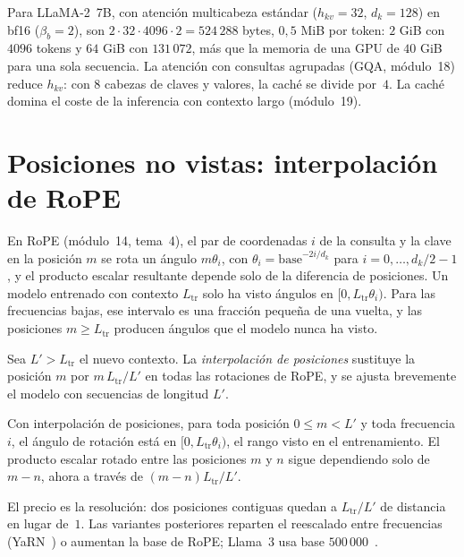 Para LLaMA-2~7B, con atención multicabeza estándar ($h_{kv}=32$, $d_k=128$) en bf16 ($\beta_b=2$), son $2\cdot 32\cdot 4096\cdot 2=524\,288$ bytes, $0{,}5$ MiB por token: $2$ GiB con $4096$ tokens y $64$ GiB con $131\,072$, más que la memoria de una GPU de $40$ GiB para una sola secuencia. La atención con consultas agrupadas (GQA, módulo~18) reduce $h_{kv}$: con $8$ cabezas de claves y valores, la caché se divide por~$4$. La caché domina el coste de la inferencia con contexto largo (módulo~19).

\section{Posiciones no vistas: interpolación de RoPE}

En RoPE (módulo~14, tema~4), el par de coordenadas $i$ de la consulta y la clave en la posición $m$ se rota un ángulo $m\theta_i$, con $\theta_i=\text{base}^{-2i/d_k}$ para $i=0,\dots,d_k/2-1$, y el producto escalar resultante depende solo de la diferencia de posiciones. Un modelo entrenado con contexto $L_{\mathrm{tr}}$ solo ha visto ángulos en $[0,L_{\mathrm{tr}}\theta_i)$. Para las frecuencias bajas, ese intervalo es una fracción pequeña de una vuelta, y las posiciones $m\ge L_{\mathrm{tr}}$ producen ángulos que el modelo nunca ha visto.

\begin{definicion}
Sea $L'>L_{\mathrm{tr}}$ el nuevo contexto. La \emph{interpolación de posiciones} sustituye la posición $m$ por $m\,L_{\mathrm{tr}}/L'$ en todas las rotaciones de RoPE, y se ajusta brevemente el modelo con secuencias de longitud $L'$.
\end{definicion}

\begin{proposicion}\label{prop:pi}
Con interpolación de posiciones, para toda posición $0\le m<L'$ y toda frecuencia $i$, el ángulo de rotación está en $[0,L_{\mathrm{tr}}\theta_i)$, el rango visto en el entrenamiento. El producto escalar rotado entre las posiciones $m$ y $n$ sigue dependiendo solo de $m-n$, ahora a través de $(m-n)L_{\mathrm{tr}}/L'$.
\end{proposicion}

\addtocounter{definicion}{1}%

El precio es la resolución: dos posiciones contiguas quedan a $L_{\mathrm{tr}}/L'$ de distancia en lugar de~$1$. Las variantes posteriores reparten el reescalado entre frecuencias (YaRN~\cite{yarn}) o aumentan la base de RoPE; Llama~3 usa base $500\,000$~\cite[§3.2]{llama3}.

